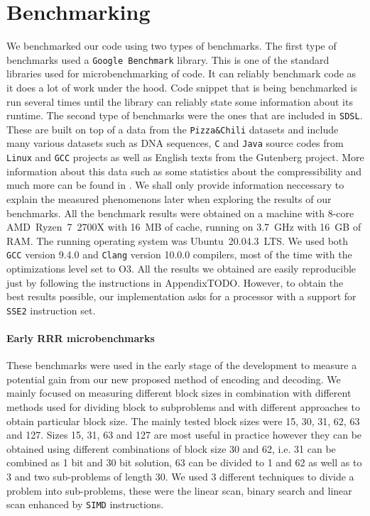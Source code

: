 \section{Benchmarking}

We benchmarked our code using two types of benchmarks. The first type of benchmarks used
a \texttt{Google Benchmark} library. This is one of the standard libraries used for
microbenchmarking of code. It can reliably benchmark code as it does a lot of work
under the hood. Code snippet that is being benchmarked is run several times until the
library can reliably state some information about its runtime. The second type of benchmarks
were the ones that are included in \texttt{SDSL}. These are built on top of a data from the
\texttt{Pizza\&Chili} datasets \citep{ferragina2005pizza} and include many various datasets such
as DNA sequences, \texttt{C} and \texttt{Java} source codes from \texttt{Linux} and \texttt{GCC}
projects as well as English texts from the Gutenberg project. More information about this
data such as some statistics about the compressibility and much more can be found in
\cite{ferragina2009compressed}. We shall only provide information neccessary to explain the
measured phenomenons later when exploring the results of our benchmarks. All the benchmark
results were obtained on a machine with 8-core AMD~Ryzen~7~2700X with 16~MB of cache, running
on 3.7~GHz with 16~GB of RAM. The running operating system was Ubuntu~20.04.3~LTS.
We used both \texttt{GCC} version 9.4.0 and \texttt{Clang} version 10.0.0 compilers,
most of the time with the optimizations level set to O3. All the results we obtained are
easily reproducible just by following the instructions in AppendixTODO. However, to obtain
the best results possible, our implementation asks for a processor with a support for \texttt{SSE2}
instruction set.

\paragraph{Early RRR microbenchmarks}

These benchmarks were used in the early stage of the development to measure a potential gain from
our new proposed method of encoding and decoding. We mainly focused on measuring different block sizes
in combination with different methods used for dividing block to subproblems and with different
approaches to obtain particular block size. The mainly tested block sizes were 15, 30, 31, 62, 63
and 127. Sizes 15, 31, 63 and 127 are most useful in practice however they can be obtained using
different combinations of block size 30 and 62, i.e. 31 can be combined as 1 bit and 30 bit solution,
63 can be divided to 1 and 62 as well as to 3 and two sub-problems of length 30.
We used 3 different techniques to divide a problem into sub-problems, these were the linear scan,
binary search and linear scan enhanced by \texttt{SIMD} instructions.

